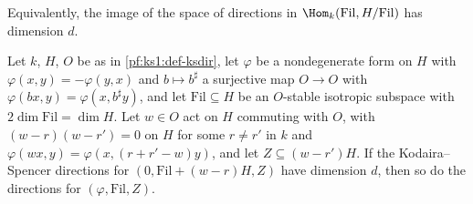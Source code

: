 Equivalently, the image of the space of directions in $\Hom_k(\mathrm{Fil},H/\mathrm{Fil})$ has dimension $d$.

\begin{lemma}\label{pf:ks1:lem-ksreduce}
Let $k$, $H$, $O$ be as in \cref{pf:ks1:def-ksdir}, let $\varphi$ be a nondegenerate form on $H$ with $\varphi(x,y)=-\varphi(y,x)$ and $b\mapsto b^\sharp$ a surjective map
$O\to O$ with $\varphi(bx,y)=\varphi(x,b^\sharp y)$, and let $\mathrm{Fil}\subseteq H$ be an $O$-stable isotropic subspace with
$2\dim\mathrm{Fil}=\dim H$. Let $w\in O$ act on $H$ commuting with $O$, with $(w-r)(w-r')=0$ on $H$ for some $r\neq r'$ in $k$ and
$\varphi(wx,y)=\varphi(x,(r+r'-w)y)$, and let $Z\subseteq(w-r')H$. If the Kodaira--Spencer directions for $(0,\mathrm{Fil}+(w-r)H,Z)$ have dimension
$d$, then so do the directions for $(\varphi,\mathrm{Fil},Z)$.
\end{lemma}

